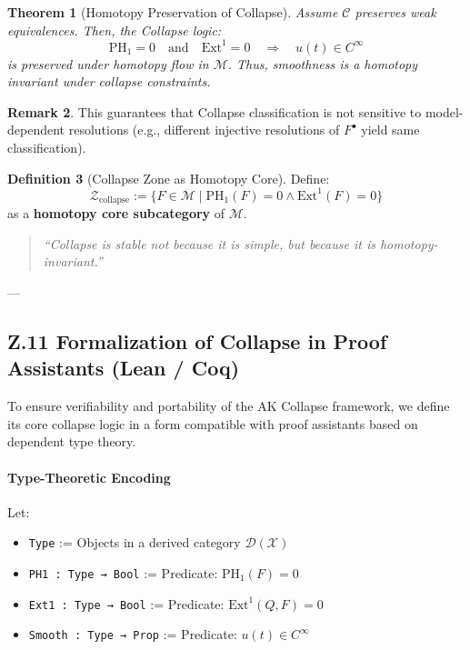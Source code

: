 \documentclass[11pt]{article}
\newtheorem{theorem}{Theorem}[section]
\theoremstyle{definition}
\newtheorem{definition}[theorem]{Definition}
\newtheorem{remark}[theorem]{Remark}
\begin{document}
\begin{theorem}[Homotopy Preservation of Collapse]
Assume $\mathcal{C}$ preserves weak equivalences.  
Then, the Collapse logic:
\[
\mathrm{PH}_1 = 0 \quad \text{and} \quad \mathrm{Ext}^1 = 0 \quad \Rightarrow \quad u(t) \in C^\infty
\]
is preserved under homotopy flow in $\mathcal{M}$.  
Thus, smoothness is a homotopy invariant under collapse constraints.
\end{theorem}

\begin{remark}
This guarantees that Collapse classification is not sensitive to model-dependent resolutions  
(e.g., different injective resolutions of $F^\bullet$ yield same classification).
\end{remark}

\begin{definition}[Collapse Zone as Homotopy Core]
Define:
\[
\mathcal{Z}_{\text{collapse}} := \{ F \in \mathcal{M} \mid \mathrm{PH}_1(F) = 0 \land \mathrm{Ext}^1(F) = 0 \}
\]
as a \textbf{homotopy core subcategory} of $\mathcal{M}$.
\end{definition}

\begin{quote}
\textit{“Collapse is stable not because it is simple, but because it is homotopy-invariant.”}
\end{quote}

---

\subsection*{Z.11 Formalization of Collapse in Proof Assistants (Lean / Coq)}

To ensure verifiability and portability of the AK Collapse framework,  
we define its core collapse logic in a form compatible with proof assistants based on dependent type theory.

\paragraph{Type-Theoretic Encoding}

Let:

\begin{itemize}
  \item \texttt{Type} := Objects in a derived category \( \mathcal{D}(\mathcal{X}) \)
  \item \texttt{PH1 : Type → Bool} := Predicate: \( \mathrm{PH}_1(F) = 0 \)
  \item \texttt{Ext1 : Type → Bool} := Predicate: \( \mathrm{Ext}^1(Q,F) = 0 \)
  \item \texttt{Smooth : Type → Prop} := Predicate: \( u(t) \in C^\infty \)
\end{itemize}
\end{document}
